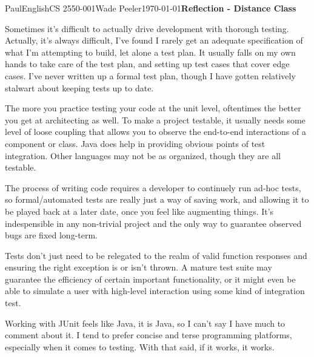 \documentclass[12pt,letterpaper]{article}
\begin{document}
\begin{mla}{Paul}{English}{CS 2550-001}{Wade Peeler}{\today}{\textbf{Reflection - Distance Class}}

Sometimes it's difficult to actually drive development with thorough
testing. Actually, it's always difficult, I've found I rarely get an
adequate specification of what I'm attempting to build, let alone a
test plan. It usually falls on my own hands to take care of the test
plan, and setting up test cases that cover edge cases. I've never
written up a formal test plan, though I have gotten relatively
stalwart about keeping tests up to date.

The more you practice testing your code at the unit level, oftentimes
the better you get at architecting as well. To make a project
testable, it usually needs some level of loose coupling that allows
you to observe the end-to-end interactions of a component or class.
Java does help in providing obvious points of test integration. Other
languages may not be as organized, though they are all testable.

The process of writing code requires a developer to continuely run
ad-hoc tests, so formal/automated tests are really just a way of
saving work, and allowing it to be played back at a later date, once
you feel like augmenting things. It's indespensible in any non-trivial
project and the only way to guarantee observed bugs are fixed
long-term.

Tests don't just need to be relegated to the realm of valid function
responses and ensuring the right exception is or isn't thrown. A
mature test suite may guarantee the efficiency of certain important
functionality, or it might even be able to simulate a user with
high-level interaction using some kind of integration test.

Working with JUnit feels like Java, it is Java, so I can't say I have
much to comment about it. I tend to prefer concise and terse
programming platforms, especially when it comes to testing. With that
said, if it works, it works.

\end{mla}
\end{document}
